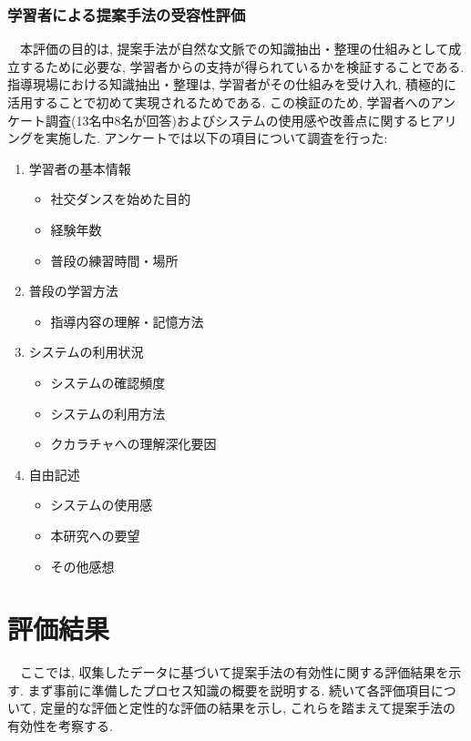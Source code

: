 \subsubsection{学習者による提案手法の受容性評価}
　本評価の目的は, 提案手法が自然な文脈での知識抽出・整理の仕組みとして成立するために必要な, 学習者からの支持が得られているかを検証することである. 指導現場における知識抽出・整理は, 学習者がその仕組みを受け入れ, 積極的に活用することで初めて実現されるためである. この検証のため, 学習者へのアンケート調査(13名中8名が回答)およびシステムの使用感や改善点に関するヒアリングを実施した. アンケートでは以下の項目について調査を行った:\\
\begin{enumerate}
\item 学習者の基本情報
    \begin{itemize}
        \item 社交ダンスを始めた目的
        \item 経験年数
        \item 普段の練習時間・場所
    \end{itemize}
\item 普段の学習方法
    \begin{itemize}
        \item 指導内容の理解・記憶方法
    \end{itemize}
\item システムの利用状況
    \begin{itemize}
        \item システムの確認頻度
        \item システムの利用方法
        \item クカラチャへの理解深化要因
    \end{itemize}
\item 自由記述
    \begin{itemize}
        \item システムの使用感
        \item 本研究への要望
        \item その他感想
    \end{itemize}
\end{enumerate}


\section{評価結果}
　ここでは, 収集したデータに基づいて提案手法の有効性に関する評価結果を示す. まず事前に準備したプロセス知識の概要を説明する. 続いて各評価項目について, 定量的な評価と定性的な評価の結果を示し, これらを踏まえて提案手法の有効性を考察する.





